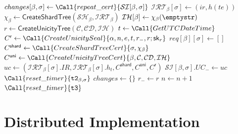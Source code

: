 \begin{algorithm}
  \caption{Unicity Certificate Generation}\label{alg:uc-gen}
  \begin{algorithmic}[0]
      
         
            \State $changes[\beta,\sigma] \gets \Call{repeat\_cert}{\mathcal{SI}[\beta, \sigma]}$    
          \EndIf
        \EndFor
      \EndFor
         
         \State $\mathcal{IRT}_\beta[\sigma] \gets (ir, h(te))$
      \EndFor
        \State $\chi_\beta\gets\mathsf{CreateShardTree}(\mathcal{SH}_\beta,\mathcal{IRT}_\beta)$        
        \State $\mathcal{IH}[\beta]\gets \chi_\beta(\emptystr)$
      \EndFor
      \State $r \gets \mathsf{CreateUnicityTree}(\mathcal{C}, \mathcal{CD}, \mathcal{IH})$ 
      \State $t \gets \Call{GetUTCDateTime}$
      \State $C^\mathsf{r} \gets \Call{CreateUnicitySeal}{\alpha, n, e, t, r_-, r; \mathsf{sk}_r}$
        \State $req[\beta][\sigma] \gets []$
        \State $C^\mathsf{shard} \gets \Call{CreateShardTreeCert}{\sigma, \chi_\beta}$
        \State $C^\mathsf{uni} \gets \Call{CreateUnicityTreeCert}{\beta, \mathcal{C}, \mathcal{CD}, \mathcal{IH}}$
        \State $uc \gets (\mathcal{IRT}_\beta[\sigma].IR, \mathcal{IRT}_\beta[\sigma].h_t, C^\mathsf{shard}, C^\mathsf{uni}, C^\mathsf{r})$
        \State $\mathcal{SI}[\beta, \sigma].UC_- \gets uc$
         
          \State {} 
        \EndFor
        \State $\Call{reset\_timer}{\texttt{t2}_{\beta, \sigma}}$
      \EndFor
      \State $changes \gets \{\}$
      \State $r_- \gets r$
      \State $n \gets n+1$
      \State $\Call{reset\_timer}{\texttt{t3}}$
      \State {}
    \EndEvent
  \end{algorithmic}
\end{algorithm}


\section{Distributed Implementation}\label{sec:distributed-bft-core}

